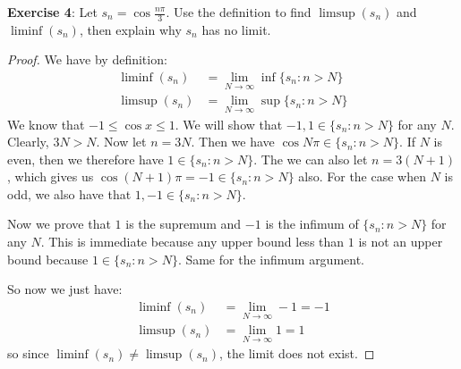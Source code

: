 \documentclass{article}
\begin{document}
\textbf{Exercise 4}: Let $s_{n} = \cos{\frac{n\pi}{3}}$. Use the definition to find $\mathop{limsup}(s_{n})$ and $\mathop{liminf}(s_{n})$, then explain why $s_{n}$ has no limit. 
    \begin{proof}
        We have by definition:
            \begin{align*}
                \mathop{liminf}(s_{n}) &= \lim\limits_{N \to \infty} \mathop{inf}\{s_{n} : n > N\} \\
                \mathop{limsup}(s_{n}) &= \lim\limits_{N \to \infty} \mathop{sup}\{s_{n} : n > N\}
            \end{align*}
        We know that $-1 \leq \cos{x} \leq 1$. We will show that $-1, 1 \in \{s_{n} : n> N\}$ for any $N$. Clearly, $3N > N$. Now let $n = 3N$. Then we have $\cos{N\pi} \in \{s_{n} : n> N\}$. If $N$ is even, then we therefore have $1 \in \{s_{n} : n > N\}$. The we can also let $n = 3(N + 1)$, which gives us $\cos{(N + 1)\pi} = -1 \in \{s_{n} : n > N\}$ also. For the case when $N$ is odd, we also have that $1, -1 \in \{s_{n} : n > N\}$.

        Now we prove that $1$ is the supremum and $-1$ is the infimum of $\{s_{n} : n > N\}$ for any $N$. This is immediate because any upper bound less than $1$ is not an upper bound because $1 \in \{s_{n} : n > N\}$. Same for the infimum argument.

        So now we just have:
            \begin{align*}
                \mathop{liminf}(s_{n}) &= \lim\limits_{N \to \infty} -1 = -1 \\
                \mathop{limsup}(s_{n}) &= \lim\limits_{N \to \infty} 1  = 1   
            \end{align*}
        so since $\mathop{liminf}(s_{n}) \neq \mathop{limsup}(s_{n})$, the limit does not exist.
    \end{proof}
\end{document}
